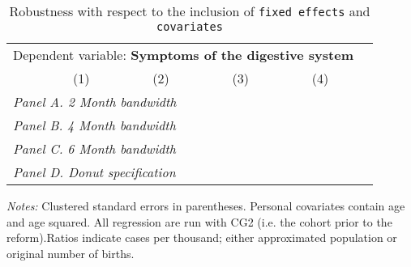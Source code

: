  \begin{table}[H] \begin{threeparttable} \centering \caption{Robustness with respect to the inclusion of \texttt{fixed effects} and \texttt{covariates}} {\def\sym#1{\ifmmode^{#1}\else\(^{#1}\)\fi} \begin{tabular}{l*{5}{c}} \toprule \multicolumn{5}{c}{Dependent variable: \textbf{Symptoms of the digestive system}} \\ \cmidrule(lr){2-5}
            &\multicolumn{1}{c}{(1)}&\multicolumn{1}{c}{(2)}&\multicolumn{1}{c}{(3)}&\multicolumn{1}{c}{(4)}\\
\midrule
 \multicolumn{5}{l}{\emph{Panel A. 2 Month bandwidth}} \\    \midrule\multicolumn{5}{l}{\emph{Panel B. 4 Month bandwidth}} \\    \midrule\multicolumn{5}{l}{\emph{Panel C. 6 Month bandwidth}} \\    \midrule\multicolumn{5}{l}{\emph{Panel D. Donut specification}} \\    \midrule  
\bottomrule \end{tabular} } \begin{tablenotes} \item \scriptsize \emph{Notes:} Clustered standard errors in parentheses. Personal covariates contain age and age squared. All regression are run with CG2 (i.e. the cohort prior to the reform).Ratios indicate cases per thousand; either approximated population or original number of births. \end{tablenotes} \end{threeparttable} \end{table} 
